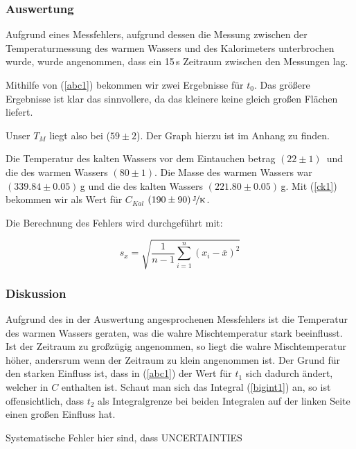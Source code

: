 \documentclass[11pt,a4paper]{article}
\begin{document}
\subsubsection{Auswertung}

Aufgrund eines Messfehlers, aufgrund dessen die Messung zwischen der Temperaturmessung des warmen Wassers und des Kalorimeters unterbrochen wurde, wurde angenommen, dass ein 15\,s Zeitraum zwischen den Messungen lag.

Mithilfe von (\ref{abc1}) bekommen wir zwei Ergebnisse f\"ur $t_0$. Das gr\"o\ss ere Ergebnisse ist klar das sinnvollere, da das kleinere keine gleich gro\ss en Fl\"achen liefert.

Unser $T_M$ liegt also bei ($59\pm2$)\celsius. Der Graph hierzu ist im Anhang zu finden.

Die Temperatur des kalten Wassers vor dem Eintauchen betrag $(22\pm1)$\celsius \ und die des warmen Wassers $(80\pm1)$\celsius. Die Masse des warmen Wassers war $(339.84\pm0.05)$\,g und die des kalten Wassers $(221.80\pm0.05)$\,g. Mit (\ref{ck1}) bekommen wir als Wert f\"ur $C_{Kal}$ $(190\pm90)\,\nicefrac{\mathrm{J}}{\mathrm{K}}$.

Die Berechnung des Fehlers wird durchgef\"uhrt mit:

\begin{equation}
s_x=\sqrt{\frac{1}{n-1}\sum_{i=1}^n(x_i-\overline{x})^2}\label{uncertainty1}
\end{equation}




\subsubsection{Diskussion}

Aufgrund des in der Auswertung angesprochenen Messfehlers ist die Temperatur des warmen Wassers geraten, was die wahre Mischtemperatur stark beeinflusst. Ist der Zeitraum zu gro\ss z\"ugig angenommen, so liegt die wahre Mischtemperatur h\"oher, andersrum wenn der Zeitraum zu klein angenommen ist. Der Grund f\"ur den starken Einfluss ist, dass in (\ref{abc1}) der Wert f\"ur $t_1$ sich dadurch \"andert, welcher in $C$ enthalten ist. Schaut man sich das Integral (\ref{bigint1}) an, so ist offensichtlich, dass $t_2$ als Integralgrenze bei beiden Integralen auf der linken Seite einen gro\ss en Einfluss hat.

Systematische Fehler hier sind, dass UNCERTAINTIES
\end{document}

